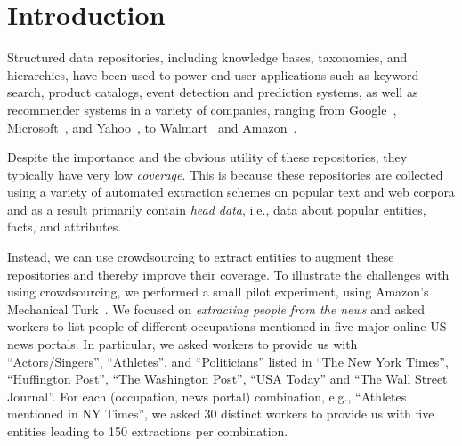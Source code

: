 


\section{Introduction}
\label{sec:intro}


Structured data repositories, including knowledge bases, taxonomies, and hierarchies, 
have been used to power end-user applications such as keyword search,
product catalogs, event detection and prediction systems,
as well as recommender systems in a variety of companies,
ranging from Google~\cite{singhal2012introducing}, Microsoft~\cite{cheng2010fuzzy}, and Yahoo~\cite{woo}, to 
Walmart~\cite{Deshpande:2013:BMU:2463676.2465297} and Amazon~\cite{amazon-product}.

Despite the importance and the obvious utility of these repositories,
they typically have very low {\em coverage}.
This is because these repositories are collected using a variety
of automated extraction schemes on popular text and web corpora and as a result 
primarily contain {\em head data}, i.e., data about popular entities,
facts, and attributes.

Instead, we can use crowdsourcing to extract entities to 
augment these repositories and thereby improve their coverage. 
To illustrate the challenges with using crowdsourcing, we performed a
small pilot experiment, using Amazon's Mechanical Turk~\cite{mturk}.
We focused on {\em extracting people from the news} and asked workers to list 
people of different occupations mentioned in five major online US news portals. 
In particular, we asked workers to provide us with ``Actors/Singers'', ``Athletes'', and ``Politicians'' 
listed in ``The New York Times'',  ``Huffington Post'', ``The Washington Post'', ``USA  Today'' and 
``The Wall Street Journal''. For each (occupation, news portal) combination, e.g., ``Athletes mentioned in NY Times'', 
we asked 30 distinct workers to provide us with five entities leading to 150 extractions per combination.

